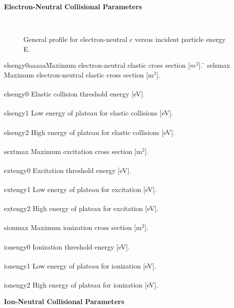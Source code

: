 \begin{section}
\begin{subsection}
\begin{subsubsection} {\bf Electron-Neutral Collisional Parameters}
\vspace{.2in}
%
\begin{figure}
\begin{center}
\leavevmode
\hbox{%
\epsfysize 4.0in
\epsfxsize 4.0in
}
\end{center}
\caption{
General profile for electron-neutral c versus incident particle energy E.
}
\label{Elect}
\end{figure}
%
\begin{tabbing}
   elsengy0aaaaa\=Maximum electron-neutral elastic cross section
		[$m^{2}$]. \= \kill 					
   selsmax\> 	 Maximum electron-neutral elastic cross section
		 [m$^{2}$]. \> \\ 					
				\\ 
   elsengy0\> 	
Elastic collision threshold energy [eV]. \> \\ 			\\
   elsengy1\>	 Low energy of plateau for elastic collisions [eV]. \> \\
				\\ 
   elsengy2\>	 High energy of plateau for elastic collisions [eV]. \> \\ 
					\\ 
   sextmax\>	 Maximum excitation cross section [m$^{2}$]. \> \\
\\ extengy0 \>	Excitation threshold energy [eV]. \> \\
\\ extengy1 \>	Low energy of plateau for excitation [eV]. \> \\
\\ extengy2 \>	High energy of plateau for excitation [eV]. \> \\
\\ sionmax \>	Maximum ionization cross section [m$^{2}$]. \> \\
\\ ionengy0 \>	Ionization threshold energy [eV]. \> \\
					\\
      ionengy1 \> Low energy of plateau for ionization [eV]. \> \\
\\ ionengy2 \> High energy of plateau for ionization [eV]. \>
\end{tabbing}
\end{subsubsection}

\begin{subsubsection} {\bf Ion-Neutral Collisional Parameters} 


\end{subsubsection}
\end{subsection}
\end{section}
